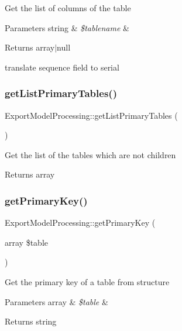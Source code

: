 Get the list of columns of the table


\begin{DoxyParams}[1]{Parameters}
string & {\em \$tablename} & \\
\hline
\end{DoxyParams}
\begin{DoxyReturn}{Returns}
array$\vert$null 
\end{DoxyReturn}
translate sequence field to serial\mbox{\label{classExportModelProcessing_a92d950555aa256e6ef6ceb0a976e83e5}} 
\subsubsection{\texorpdfstring{get\+List\+Primary\+Tables()}{getListPrimaryTables()}}
{\footnotesize\ttfamily Export\+Model\+Processing\+::get\+List\+Primary\+Tables (\begin{DoxyParamCaption}{ }\end{DoxyParamCaption})}

Get the list of the tables which are not children

\begin{DoxyReturn}{Returns}
array 
\end{DoxyReturn}
\mbox{\label{classExportModelProcessing_ae891c1f59aee9f32d1de48d4e88bec19}} 
\subsubsection{\texorpdfstring{get\+Primary\+Key()}{getPrimaryKey()}}
{\footnotesize\ttfamily Export\+Model\+Processing\+::get\+Primary\+Key (\begin{DoxyParamCaption}\item[{array}]{\$table }\end{DoxyParamCaption})}

Get the primary key of a table from structure


\begin{DoxyParams}[1]{Parameters}
array & {\em \$table} & \\
\hline
\end{DoxyParams}
\begin{DoxyReturn}{Returns}
string 
\end{DoxyReturn}
\mbox{\label{classExportModelProcessing_a048a271e644dfa50549826dce12737bd}} 
